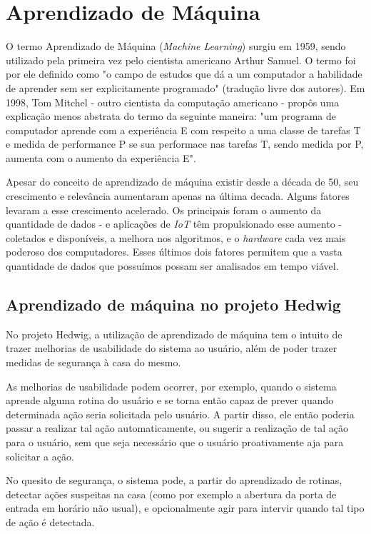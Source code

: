 \chapter{Aprendizado de Máquina}

	O termo Aprendizado de Máquina (\emph{Machine Learning}) surgiu em 1959, sendo utilizado pela primeira vez  pelo cientista americano Arthur Samuel. O termo foi por ele definido como "o campo de estudos que dá a um computador a habilidade de aprender sem ser explicitamente programado" (tradução livre dos autores). Em 1998, Tom Mitchel - outro cientista da computação americano - propôs uma explicação menos abstrata do termo da seguinte maneira: "um programa de computador aprende com a experiência E com respeito a uma classe de tarefas T e medida de performance P se sua performace nas tarefas T, sendo medida por P, aumenta com o aumento da experiência E".

	Apesar do conceito de aprendizado de máquina existir desde a década de 50, seu crescimento e relevância aumentaram apenas na última decada. Alguns fatores levaram a esse crescimento acelerado. Os principais foram o aumento da quantidade de dados - e aplicações de \emph{IoT} têm propulsionado esse aumento - coletados e disponíveis, a melhora nos algoritmos, e o \emph{hardware} cada vez mais poderoso dos computadores. Esses últimos dois fatores permitem que a vasta quantidade de dados que possuímos possam ser analisados em tempo viável.

	\section{Aprendizado de máquina no projeto Hedwig}
		No projeto Hedwig, a utilização de aprendizado de máquina tem o intuito de trazer melhorias de usabilidade do sistema ao usuário, além de poder trazer medidas de segurança à casa do mesmo.

		As melhorias de usabilidade podem ocorrer, por exemplo, quando o sistema aprende alguma rotina do usuário e se torna então capaz de prever quando determinada ação seria solicitada pelo usuário. A partir disso, ele então poderia passar a realizar tal ação automaticamente, ou sugerir a realização de tal ação para o usuário, sem que seja necessário que o usuário proativamente aja para solicitar a ação.

		No quesito de segurança, o sistema pode, a partir do aprendizado de rotinas, detectar ações suspeitas na casa (como por exemplo a abertura da porta de entrada em horário não usual), e opcionalmente agir para intervir quando tal tipo de ação é detectada.

